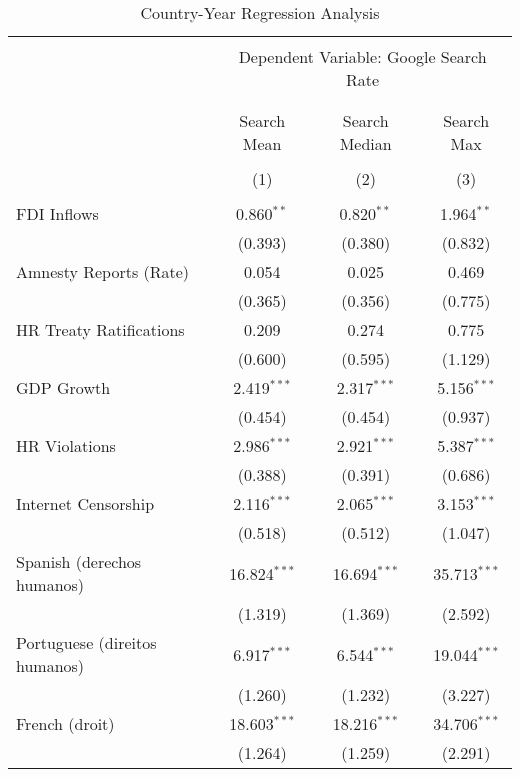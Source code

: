 
\begin{table}[!htbp] \centering 
  \caption{Country-Year Regression Analysis} 
  \label{} 
\begin{tabular}{@{\extracolsep{5pt}}lccc} 
\\[-1.8ex]\hline 
\hline \\[-1.8ex] 
 & \multicolumn{3}{c}{Dependent Variable: Google Search Rate} \\ 
\cline{2-4} 
\\[-1.8ex] & \multicolumn{3}{c}{ } \\ 
 & Search Mean & Search Median & Search Max \\ 
\\[-1.8ex] & (1) & (2) & (3)\\ 
\hline \\[-1.8ex] 
 FDI Inflows & 0.860$^{**}$ & 0.820$^{**}$ & 1.964$^{**}$ \\ 
  & (0.393) & (0.380) & (0.832) \\ 
  Amnesty Reports (Rate) & 0.054 & 0.025 & 0.469 \\ 
  & (0.365) & (0.356) & (0.775) \\ 
  HR Treaty Ratifications & 0.209 & 0.274 & 0.775 \\ 
  & (0.600) & (0.595) & (1.129) \\ 
  GDP Growth & 2.419$^{***}$ & 2.317$^{***}$ & 5.156$^{***}$ \\ 
  & (0.454) & (0.454) & (0.937) \\ 
  HR Violations & 2.986$^{***}$ & 2.921$^{***}$ & 5.387$^{***}$ \\ 
  & (0.388) & (0.391) & (0.686) \\ 
  Internet Censorship & 2.116$^{***}$ & 2.065$^{***}$ & 3.153$^{***}$ \\ 
  & (0.518) & (0.512) & (1.047) \\ 
  Spanish (derechos humanos) & 16.824$^{***}$ & 16.694$^{***}$ & 35.713$^{***}$ \\ 
  & (1.319) & (1.369) & (2.592) \\ 
  Portuguese (direitos humanos) & 6.917$^{***}$ & 6.544$^{***}$ & 19.044$^{***}$ \\ 
  & (1.260) & (1.232) & (3.227) \\ 
  French (droit) & 18.603$^{***}$ & 18.216$^{***}$ & 34.706$^{***}$ \\ 
  & (1.264) & (1.259) & (2.291) \\ 

\end{tabular}
\end{table}
